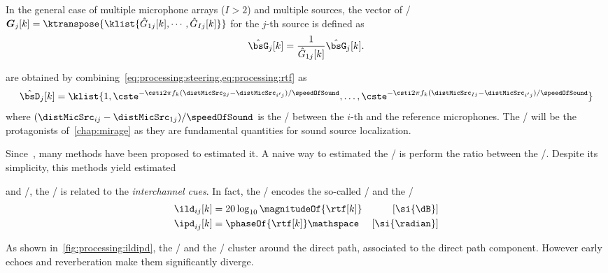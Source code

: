 In the general case of multiple microphone arrays ($I>2$) and multiple sources, the vector of \ReTFs/
$\boldsymbol{G}_j[k] = \ktranspose{\klist{\hat{G}_ {1j}[k], \cdots, \hat{G}_{Ij}[k]}}$
for the $j$-th source is defined as
\begin{equation}
    \hat{\bsG}_j[k] = \frac{1}{\hat{G}_{1j}[k]} \hat{\bsG}_j[k]
    .
\end{equation}


 are obtained by combining~\cref{eq:processing:steering,eq:processing:rtf} as
\begin{equation}\label{eq:processing:relativesteering}
    \hat{\bsD}_{j}[k] = \klist{
                         1,
                         \cste^{-\csti 2 \pi f_k (\distMicSrc_{2j}-\distMicSrc_{i'j}) / \speedOfSound},
                         \ldots,
                         \cste^{-\csti 2 \pi f_k (\distMicSrc_{Ij}-\distMicSrc_{i'j}) / \speedOfSound}
                    }
\end{equation}
where $(\distMicSrc_{ij}-\distMicSrc_{1j}) / \speedOfSound$ is the \TDOA/ between the $i$-th and the reference microphones.
The \TDOAs/ will be the protagonists of~\cref{chap:mirage} as they are fundamental quantities for sound source localization.

Since~, many methods have been proposed to estimated it.
A na\:ive way to estimated the \ReTF/ is perform the ratio between the \DTF/.
Despite its simplicity, this methods yield estimated


 and \CASA/, the \ReTF/ is related to the \textit{interchannel cues}.
In fact, the \ReTFs/ encodes the so-called \ILD/ and the \IPD/
\begin{equation}
    \begin{aligned}
        \ild_{ij}[k] &= 20 \log_{10} \magnitudeOf{\rtf[k]} & [\si{\dB}]\\
        \ipd_{ij}[k] &= \phaseOf{\rtf[k]} \mathspace       & [\si{\radian}]
    \end{aligned}
\end{equation}

As shown in~\cref{fig:processing:ildipd}, the \ILD/ and the \IPD/ cluster around the direct path, associated to the direct path component.
However early echoes and reverberation make them significantly diverge.

